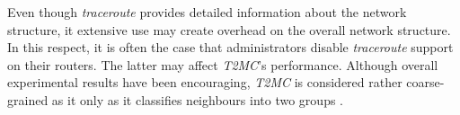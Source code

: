 Even though {\sl traceroute}
provides detailed information about the network structure, 
it extensive use may create overhead on the overall network structure. 
In this respect, it is often the case that administrators 
disable {\sl traceroute} support on their routers.
The latter may affect \emph{T2MC}'s performance.
Although overall experimental results have been encouraging, 
\emph{T2MC} is considered rather coarse-grained as it only
as it classifies neighbours into two groups \cite{QLZG2009}.
%
%
%
%
